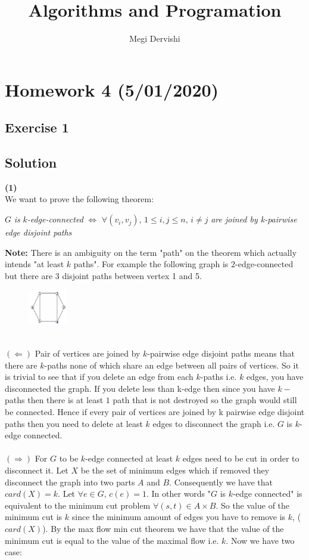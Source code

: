 \documentclass[10pt,a4paper]{article}
\author{Megi Dervishi}
\title{Algorithms and Programation}
\begin{document}
\maketitle
\section*{Homework 4 (5/01/2020)}
\subsection*{Exercise 1}
\subsection*{Solution}
\textbf{(1)}\\
We want to prove the following theorem: 
\begin{center}
$G$ \textit{is} $k$\textit{-edge-connected} $\Leftrightarrow$ $\forall (v_i,v_j), \, 1\leq i,j \leq n, \, i \neq j$ \textit{are joined by k-pairwise edge disjoint paths}
\end{center}
\textbf{Note:} There is an ambiguity on the term "path" on the theorem which actually intends "at least $k$ paths". For example the following graph is $2$-edge-connected but there are 3 disjoint paths between vertex 1 and 5.\begin{figure}[h!]
\centering
\includegraphics[width=0.15\textwidth]{graph}
\end{figure}
\\$\mathbf{(\Leftarrow)}$ Pair of vertices are joined by $k$-pairwise edge disjoint paths means that there are $k$-paths none of which share an edge between all pairs of vertices. So it is trivial to see that if you delete an edge from each $k$-paths i.e. $k$ edges, you have disconnected the graph. If you delete less than k-edge then since you have $k-$paths then there is at least $1$ path that is not destroyed so the graph would still be connected. Hence if every pair of vertices are joined by k pairwise edge disjoint paths then you need to delete at least $k$ edges to disconnect the graph i.e. $G$ is $k$- edge connected.\\\\
$\mathbf{(\Rightarrow)}$ For $G$ to be $k$-edge connected at least $k$ edges need to be cut in order to disconnect it. Let $X$ be the set of minimum edges which if removed they disconnect the graph into two parts $A$ and $B$. Consequently we have that $card(X) = k$. Let $\forall e \in G, \, c(e) = 1$. In other words "$G$ is $k$-edge connected" is equivalent to the minimum cut problem $\forall (s,t) \in A\times B$.  So the value of the minimum cut is $k$ since the minimum amount of edges you have to remove is $k$, ($card(X)$). By the max flow min cut theorem we have that the value of the minimum cut is equal to the value of the maximal flow i.e. $k$. Now we have two case:\\
\end{document}
